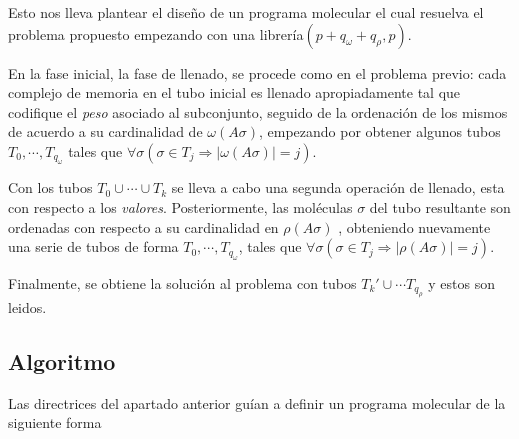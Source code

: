 \documentclass[12pt, letterpaper, twoside]{article}
\begin{document}
    Esto nos lleva plantear el diseño de un programa molecular el cual resuelva el problema propuesto empezando con una librería$(p+q_\omega+q_\rho, p)$.


    En la fase inicial, la fase de llenado, se procede como en el problema previo: cada complejo de memoria en el tubo inicial es llenado apropiadamente tal que codifique el \emph{peso} asociado al subconjunto, seguido de la ordenación de los mismos de acuerdo a su cardinalidad de $\omega(A\sigma)$, empezando por obtener algunos tubos $T_0,\cdots,T_{q_\omega}$ tales que $\forall\sigma(\sigma\in T_j \Rightarrow |\omega(A\sigma)|=j)$.


    Con los tubos $T_0\cup\cdots\cup T_k$ se lleva a cabo una segunda operación de llenado, esta con respecto a los \emph{valores}. Posteriormente, las moléculas $\sigma$ del tubo resultante son ordenadas con respecto a su cardinalidad en $\rho(A\sigma)$ , obteniendo nuevamente una serie de tubos de forma $T_0,\cdots,T_{q_\omega}$, tales que $\forall\sigma(\sigma\in T_j \Rightarrow |\rho(A\sigma)| = j)$.


    Finalmente, se obtiene la solución al problema con tubos $T_k'\cup\cdots T_{q_\rho}$ y estos son leidos.
    \newpage
    \subsection{Algoritmo}
    Las directrices del apartado anterior guían a definir un programa molecular de la siguiente forma

    \begin{algorithm}
        \begin{algorithmic}[1]
            \EndFor
            \EndFor
            \EndProcedure
        \end{algorithmic}
    \end{algorithm}
\end{document}
